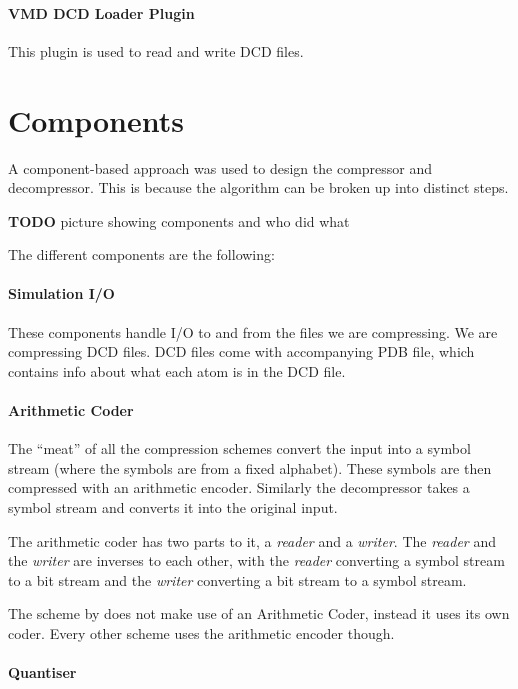 \documentclass{report}
\newcommand{\todo}{\textbf{TODO} }
\begin{document}
\paragraph{VMD DCD Loader Plugin}
This plugin is used to read and write DCD files.


\section{Components}

A component-based approach was used to design the compressor and
decompressor. This is because the algorithm can be broken up into distinct
steps.

\todo picture showing components and who did what

The different components are the following:

\paragraph{Simulation I/O}

These components handle I/O to and from the files we are compressing. We are
compressing DCD files. DCD files come with accompanying PDB file, which
contains info about what each atom is in the DCD file.


\paragraph{Arithmetic Coder}

The ``meat'' of all the compression schemes convert the input into a symbol
stream (where the symbols are from a fixed alphabet). These symbols are then
compressed with an arithmetic encoder. Similarly the decompressor takes a
symbol stream and converts it into the original input.

The arithmetic coder has two parts to it, a \emph{reader} and a
\emph{writer}. The \emph{reader} and the \emph{writer} are inverses to each
other, with the \emph{reader} converting a symbol stream to a bit stream and
the \emph{writer} converting a bit stream to a symbol stream.

The scheme by \citet{omeltchenko2000sls} does not make use of an Arithmetic
Coder, instead it uses its own coder. Every other scheme uses the arithmetic
encoder though.


\paragraph{Quantiser}
\end{document}
